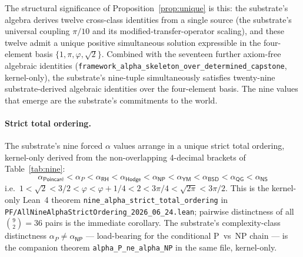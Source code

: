 \documentclass[11pt,a4paper]{amsart}
\theoremstyle{plain}
\theoremstyle{definition}
\begin{document}
The structural significance of Proposition~\ref{prop:unique} is this: the substrate's algebra derives twelve cross-class identities from a single source (the substrate's universal coupling $\pi/10$ and its modified-transfer-operator scaling), and these twelve admit a unique positive simultaneous solution expressible in the four-element basis $\{1, \pi, \varphi, \sqrt{2}\}$. Combined with the seventeen further axiom-free algebraic identities (\texttt{framework\_alpha\_skeleton\_over\_determined\_capstone}, kernel-only), the substrate's nine-tuple simultaneously satisfies twenty-nine substrate-derived algebraic identities over the four-element basis. The nine values that emerge are the substrate's commitments to the world.

\paragraph{Strict total ordering.} The substrate's nine forced $\alpha$ values arrange in a unique strict total ordering, kernel-only derived from the non-overlapping 4-decimal brackets of Table~\ref{tab:nine}:
\[
\alpha_{\textsf{Poincar\'e}} < \alpha_P < \alpha_{\textsf{RH}} < \alpha_{\textsf{Hodge}} < \alpha_{\textsf{NP}} < \alpha_{\textsf{YM}} < \alpha_{\textsf{BSD}} < \alpha_{\textsf{QG}} < \alpha_{\textsf{NS}}
\]
i.e.\ $1 < \sqrt{2} < 3/2 < \varphi < \varphi + 1/4 < 2 < 3\pi/4 < \sqrt{2\pi} < 3\pi/2$. This is the kernel-only Lean~4 theorem \texttt{nine\_alpha\_strict\_total\_ordering} in \texttt{PF/AllNineAlphaStrictOrdering\_2026\_06\_24.lean}; pairwise distinctness of all $\binom{9}{2} = 36$ pairs is the immediate corollary. The substrate's complexity-class distinctness $\alpha_P \neq \alpha_{\textsf{NP}}$ --- load-bearing for the conditional P~vs~NP chain --- is the companion theorem \texttt{alpha\_P\_ne\_alpha\_NP} in the same file, kernel-only.
\end{document}
